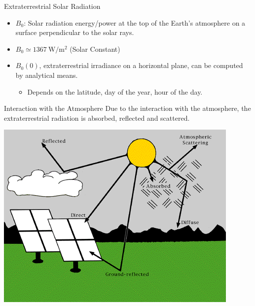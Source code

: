 \documentclass[xcolor={usenames,svgnames,dvipsnames}]{beamer}
\begin{document}
\begin{frame}[label={sec:orgdb4af03}]{Extraterrestrial Solar Radiation}
\begin{itemize}
\item \(B_0\): Solar radiation energy/power at the top of the Earth's atmosphere on a surface perpendicular to the solar rays.
\item \(B_0 \simeq \SI{1367}{\watt\per\meter\squared}\) (Solar Constant)
\item \(B_0(0)\), extraterrestrial irradiance on a horizontal plane, can be computed by analytical means.
\begin{itemize}
\item Depends on the latitude, day of the year, hour of the day.
\end{itemize}
\end{itemize}
\end{frame}

\begin{frame}[label={sec:orgfeac762}]{Interaction with the Atmosphere}
Due to the interaction with the atmosphere, the extraterrestrial radiation is absorbed, reflected and scattered.

\begin{center}
\includegraphics[height=0.5\textheight]{../figs/SolarRadiationComponents_NREL.png}
\end{center}
\end{frame}
\end{document}
